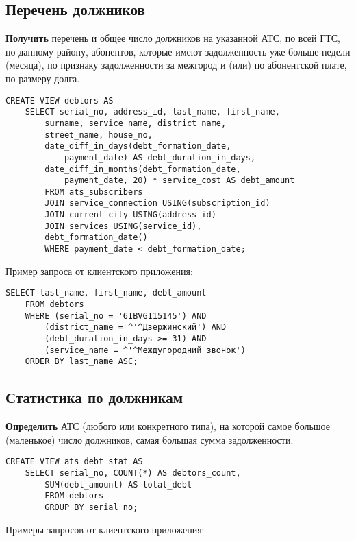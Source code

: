 \documentclass{report}
\begin{document}
\subsection{Перечень должников}

\textbf{Получить} перечень и общее число должников на указанной АТС, 
по всей ГТС, по данному району, абонентов, которые имеют задолженность 
уже больше недели (месяца), по признаку задолженности за межгород и (или) 
по абонентской плате, по размеру долга.

\begin{lstlisting}
CREATE VIEW debtors AS
    SELECT serial_no, address_id, last_name, first_name,
        surname, service_name, district_name,
        street_name, house_no,
        date_diff_in_days(debt_formation_date, 
            payment_date) AS debt_duration_in_days,
        date_diff_in_months(debt_formation_date, 
            payment_date, 20) * service_cost AS debt_amount
        FROM ats_subscribers
        JOIN service_connection USING(subscription_id)
        JOIN current_city USING(address_id)
        JOIN services USING(service_id),
        debt_formation_date()
        WHERE payment_date < debt_formation_date;
\end{lstlisting}

Пример запроса от клиентского приложения:

\begin{lstlisting}
SELECT last_name, first_name, debt_amount
	FROM debtors
	WHERE (serial_no = '6IBVG115145') AND
		(district_name = ^'^Дзержинский') AND
		(debt_duration_in_days >= 31) AND
		(service_name = ^'^Междугородний звонок')
	ORDER BY last_name ASC;
\end{lstlisting}

\subsection{Статистика по должникам}

\textbf{Определить} АТС (любого или конкретного типа), на которой 
самое большое (маленькое) число должников, самая большая сумма задолженности.

\begin{lstlisting}
CREATE VIEW ats_debt_stat AS 
    SELECT serial_no, COUNT(*) AS debtors_count, 
        SUM(debt_amount) AS total_debt 
        FROM debtors
        GROUP BY serial_no;  
\end{lstlisting}

Примеры запросов от клиентского приложения:
\end{document}
